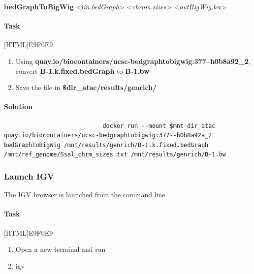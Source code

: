 \documentclass[12pt]{article}
\begin{document}
					 \textbf{bedGraphToBigWig} <i\textit{in.bedGraph}> <\textit{chrom.sizes}> <\textit{outBigWig.bw}>\\
				
					
				\paragraph{Task}

					[HTML]{E9F0E9}{\parbox{\linewidth}{%
							\begin{enumerate}
								\item  Using \textbf{quay.io/biocontainers/ucsc-bedgraphtobigwig:377--h0b8a92\_2}, convert \textbf{B-1.k.fixed.bedGraph} to \textbf{B-1.bw}
								\item  Save the file in \textbf{\$dir\_atac/results/genrich/}
							\end{enumerate}
					}}
					
					\paragraph{Solution}
	
					\begin{minipage}{\linewidth}
						\begin{lstlisting}
							docker run --mount $mnt_dir_atac quay.io/biocontainers/ucsc-bedgraphtobigwig:377--h0b8a92a_2 bedGraphToBigWig /mnt/results/genrich/B-1.k.fixed.bedGraph /mnt/ref_genome/Ssal_chrm_sizes.txt /mnt/results/genrich/B-1.bw
						\end{lstlisting}
					\end{minipage}
		
		\subsubsection{Launch IGV}
			The IGV browser is launched from the command line. 
			
				\paragraph{Task}
			
			[HTML]{E9F0E9}{\parbox{\linewidth}{%
					\begin{enumerate}
						\item  Open a new terminal and run
						\item  igv
					\end{enumerate}
			}}
			
			
\end{document}
